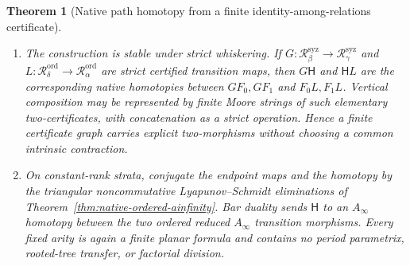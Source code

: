\documentclass[11pt]{article}
\newtheorem{theorem}{Theorem}[section]
\theoremstyle{definition}
\begin{document}
\begin{theorem}[Native path homotopy from a finite identity-among-relations certificate]
\begin{enumerate}[label=\textnormal{(\roman*)}]
\item The construction is stable under strict whiskering.  If
$G:\mathcal R_\beta^{\mathrm{syz}}\to\mathcal R_\gamma^{\mathrm{syz}}$
and $L:\mathcal R_\delta^{\mathrm{ord}}\to\mathcal R_\alpha^{\mathrm{ord}}$
are strict certified transition maps, then $G\mathsf H$ and $\mathsf HL$ are
the corresponding native homotopies between $GF_0,GF_1$ and
$F_0L,F_1L$.  Vertical composition may be represented by finite Moore
strings of such elementary two-certificates, with concatenation as a strict
operation.  Hence a finite certificate graph carries explicit two-morphisms
without choosing a common intrinsic contraction.

\item On constant-rank strata, conjugate the endpoint maps and the homotopy by
the triangular noncommutative Lyapunov--Schmidt eliminations of
Theorem~\ref{thm:native-ordered-ainfinity}.  Bar duality sends
$\mathsf H$ to an $A_\infty$ homotopy between the two ordered reduced
$A_\infty$ transition morphisms.  Every fixed arity is again a finite planar
formula and contains no period parametrix, rooted-tree transfer, or factorial
division.
\end{enumerate}
\end{theorem}
\end{document}
